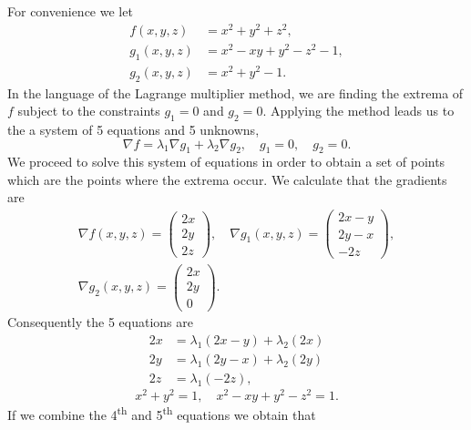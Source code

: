 \begin{solution}
    For convenience we let
    \[
        \begin{aligned}
            f(x,y,z)   & = x^2 + y^2 + z^2,          \\
            g_1(x,y,z) & = x^2 - xy + y^2 - z^2 - 1, \\
            g_2(x,y,z) & = x^2 + y^2 - 1.
        \end{aligned}
    \]
    In the language of the Lagrange multiplier method, we are finding the extrema of \(f\) subject to the constraints \(g_1=0\) and \(g_2 = 0\).
    Applying the method leads us to the a system of 5 equations and 5 unknowns,
    \[
        \nabla f  = \lambda_1 \nabla g_1  + \lambda_2 \nabla g_2,
        \quad
        g_1 = 0,
        \quad
        g_2 = 0.
    \]
    We proceed to solve this system of equations in order to obtain a set of points which are the points where the extrema occur.
    We calculate that the gradients are
    \begin{gather*}
        \nabla f (x,y,z) = \begin{pmatrix}
            2 x \\ 2y \\ 2z
        \end{pmatrix},
        \quad
        \nabla g_1(x,y,z) = \begin{pmatrix}
            2x-y \\ 2y - x \\ -2z
        \end{pmatrix},\\
        \nabla g_2(x,y,z) = \begin{pmatrix}
            2x \\ 2y \\ 0
        \end{pmatrix}.
    \end{gather*}
    Consequently the 5 equations are
    \[
        \begin{aligned}
            2x & = \lambda_1 ( 2x -y ) + \lambda_2(2x) \\
            2y & = \lambda_1 ( 2y - x) + \lambda_2(2y) \\
            2z & = \lambda_1(-2z),
        \end{aligned}
    \]
    \[
        x^2 + y^2 = 1,
        \quad
        x^2 - xy + y^2 - z^2 =1.
    \]
    If we combine the 4\textsuperscript{th} and 5\textsuperscript{th} equations we obtain that
    \begin{equation}
        \label{eq:LagrangeA}

\end{equation}
\end{solution}
